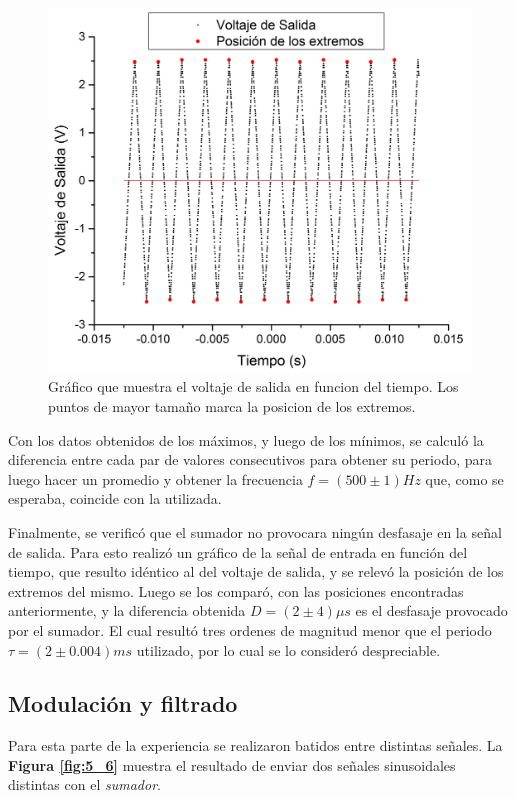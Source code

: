 \documentclass[11pt,a4paper]{article}
\begin{document}
\begin{figure}[h]
\centering
\includegraphics[scale=0.4]{Voltaje_de_Salida}
\caption{Gráfico que muestra el voltaje de salida en funcion del tiempo. Los puntos de mayor tamaño marca la posicion de los extremos.}
\label{fig:Vol_Sal}
\end{figure}

Con los datos obtenidos de los máximos, y luego de los mínimos, se calculó la diferencia entre cada par de valores consecutivos para obtener su periodo, para luego hacer un promedio y obtener la frecuencia $f= (500 \pm 1)Hz$ que, como se esperaba, coincide con la utilizada.

Finalmente, se verificó que el sumador no provocara ningún desfasaje en la señal de salida. Para esto realizó un gráfico de la señal de entrada en función del tiempo, que resulto idéntico al del voltaje de salida, y se relevó la posición de los extremos del mismo. Luego se los comparó, con las posiciones encontradas anteriormente, y la diferencia obtenida $D= (2 \pm4)\mu s$ es el desfasaje provocado por el sumador. El cual resultó tres ordenes de magnitud menor que el periodo $\tau = (2 \pm 0.004)ms$ utilizado, por lo cual se lo consideró despreciable.


\subsection{Modulación y filtrado}

Para esta parte de la experiencia se realizaron batidos entre distintas señales. La \textbf{Figura \ref{fig:5_6}} muestra el resultado de enviar dos señales sinusoidales distintas con el \textit{sumador}.
\end{document}
